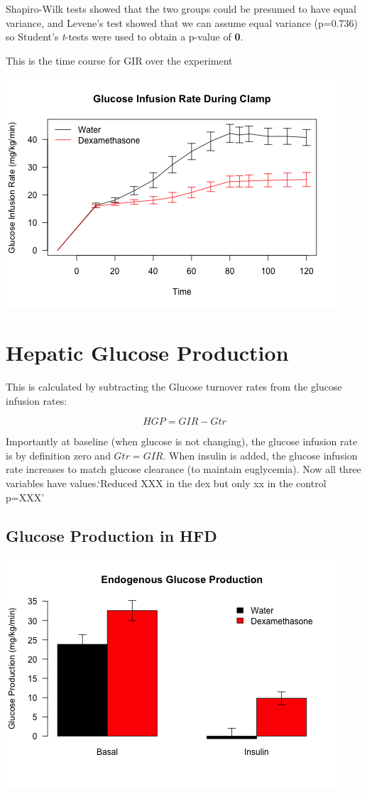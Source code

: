 \documentclass[]{article}
\begin{document}
Shapiro-Wilk tests showed that the two groups could be presumed to have
equal variance, and Levene's test showed that we can assume equal
variance (p=0.736) so Student's \emph{t}-tests were used to obtain a
p-value of \textbf{0}.

This is the time course for GIR over the experiment

\includegraphics{figures/gir-time-course-1.png}

\section{Hepatic Glucose Production}\label{hepatic-glucose-production}

This is calculated by subtracting the Glucose turnover rates from the
glucose infusion rates:

\[ HGP = GIR - Gtr \]

Importantly at baseline (when glucose is not changing), the glucose
infusion rate is by definition zero and \(Gtr = GIR\). When insulin is
added, the glucose infusion rate increases to match glucose clearance
(to maintain euglycemia). Now all three variables have values.`Reduced
XXX in the dex but only xx in the control p=XXX'

\subsection{Glucose Production in HFD}\label{glucose-production-in-hfd}

\includegraphics{figures/hgp-barplot-hfd-1.png}
\end{document}
